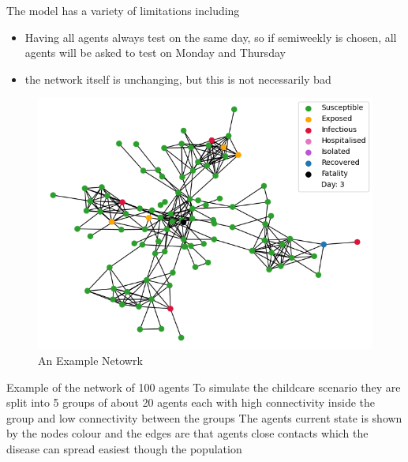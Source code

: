 \documentclass{article}
\begin{document}
The model has a variety of limitations including 
\begin{itemize}
\item Having all agents always test on the same day, so if semiweekly is chosen, all agents will be asked to test on Monday and Thursday
\item the network itself is unchanging, but this is not necessarily bad
\end{itemize}

\newpage

\begin{figure}
  \centering
      \includegraphics[width=\textwidth]{network}
  \caption{An Example Netowrk}
\end{figure}

Example of the network of 100 agents
To simulate the childcare scenario they are split into 5 groups of about 20 agents each with high connectivity inside the group and low connectivity between the groups 
The agents current state is shown by the nodes colour and the edges are that agents close contacts which the disease can spread easiest though the population
\end{document}
